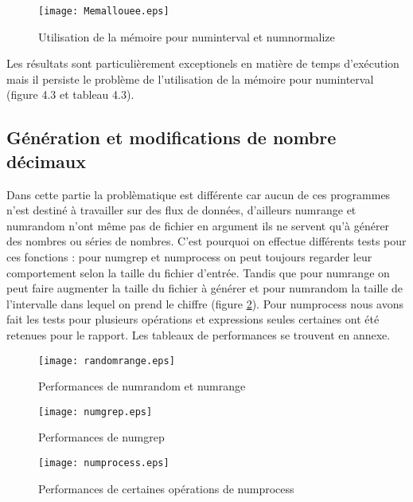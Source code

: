 \begin{figure}[h]
\begin{center}
\texttt{[image: Memallouee.eps]}
\end{center}
\label{fig:numinterval}
\caption{Utilisation de la m\'emoire pour numinterval et numnormalize}
\end{figure}

Les r\'esultats sont particuli\`erement exceptionels en mati\`ere de temps d'ex\'ecution mais il persiste le probl\`eme de l'utilisation de la
 m\'emoire pour numinterval (figure 4.3 et tableau 4.3).
\newline

\subsection{G\'en\'eration et modifications de nombre d\'ecimaux}

Dans cette partie la probl\`ematique est diff\'erente car aucun de ces programmes n'est destin\'e \`a travailler sur des flux de donn\'ees, 
d'ailleurs numrange et numrandom n'ont m\^eme pas de fichier en argument ils ne servent qu'\`a g\'en\'erer des nombres ou s\'eries de nombres.
C'est pourquoi on effectue diff\'erents tests pour ces fonctions : pour numgrep et numprocess on peut toujours regarder leur comportement selon la taille du fichier d'entr\'ee.
Tandis que pour numrange on peut faire augmenter la taille du fichier \`a g\'en\'erer et pour numrandom la taille de l'intervalle dans lequel on prend le chiffre (figure \ref{fig:randomrange}).
Pour numprocess nous avons fait les tests pour plusieurs op\'erations et expressions seules certaines ont \'et\'e retenues pour le rapport. 
Les tableaux de performances se trouvent en annexe.


\begin{figure}[h]
\begin{center}
\texttt{[image: randomrange.eps]}
\end{center}
\caption{Performances de numrandom et numrange}
\label{fig:randomrange}
\end{figure}

\begin{figure}[h]
\begin{center}
\texttt{[image: numgrep.eps]}
\end{center}
\caption{Performances de numgrep}
\label{fig:numgrep}
\end{figure}


\begin{figure}[h]
\begin{center}
\texttt{[image: numprocess.eps]}
\end{center}
\caption{Performances de certaines op\'erations de numprocess}
\label{fig:numprocess}
\end{figure}

